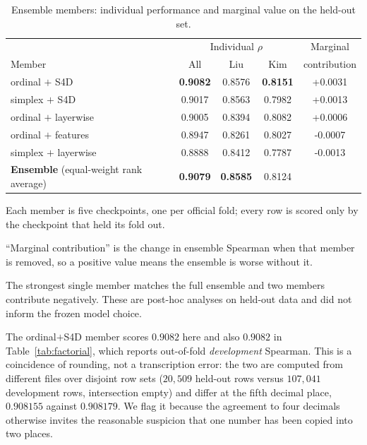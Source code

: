 \documentclass[11pt]{article}
\newcommand{\rhoS}{\rho}
\begin{document}
\begin{table}[H]
\centering
\begin{threeparttable}
\caption{Ensemble members: individual performance and marginal value on the held-out set.}
\label{tab:members}
\begin{tabular}{l S[table-format=1.4] S[table-format=1.4] S[table-format=1.4] S[table-format=+1.4]}
\toprule
& \multicolumn{3}{c}{Individual $\rhoS$} & {Marginal} \\
\cmidrule(lr){2-4}
Member & {All} & {Liu} & {Kim} & {contribution} \\
\midrule
ordinal $+$ S4D       & \bfseries 0.9082 & 0.8576 & \bfseries 0.8151 & +0.0031 \\
simplex $+$ S4D       & 0.9017 & 0.8563 & 0.7982 & +0.0013 \\
ordinal $+$ layerwise & 0.9005 & 0.8394 & 0.8082 & +0.0006 \\
ordinal $+$ features  & 0.8947 & 0.8261 & 0.8027 & -0.0007 \\
simplex $+$ layerwise & 0.8888 & 0.8412 & 0.7787 & -0.0013 \\
\midrule
\textbf{Ensemble} (equal-weight rank average) & \bfseries 0.9079 & \bfseries 0.8585 & 0.8124 & \\
\bottomrule
\end{tabular}
\begin{tablenotes}[flushleft]\footnotesize
\item Each member is five checkpoints, one per official fold; every row is scored only
by the checkpoint that held its fold out.
\item ``Marginal contribution'' is the change in ensemble Spearman when that member is
removed, so a positive value means the ensemble is worse without it.
\item The strongest single member matches the full ensemble and two members contribute
negatively. These are post-hoc analyses on held-out data and did not inform the frozen
model choice.
\item The ordinal$+$S4D member scores $0.9082$ here and also $0.9082$ in
Table~\ref{tab:factorial}, which reports out-of-fold \emph{development} Spearman. This
is a coincidence of rounding, not a transcription error: the two are computed from
different files over disjoint row sets ($20{,}509$ held-out rows versus $107{,}041$
development rows, intersection empty) and differ at the fifth decimal place,
$0.908155$ against $0.908179$. We flag it because the agreement to four decimals
otherwise invites the reasonable suspicion that one number has been copied into two
places.
\end{tablenotes}
\end{threeparttable}
\end{table}
\end{document}
